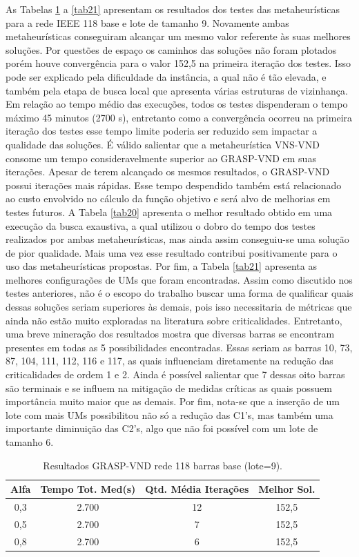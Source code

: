 \documentclass[12pt]{article}
\begin{document}
As Tabelas \ref{tab18} a \ref{tab21} apresentam os resultados dos testes das metaheurísticas para a rede IEEE 118 base e lote de tamanho 9. Novamente ambas metaheurísticas conseguiram alcançar um mesmo valor referente às suas melhores soluções. Por questões de espaço os caminhos das soluções não foram plotados porém houve convergência para o valor 152,5 na primeira iteração dos testes. Isso pode ser explicado pela dificuldade da instância, a qual não é tão elevada, e também pela etapa de busca local que apresenta várias estruturas de vizinhança. Em relação ao tempo médio das execuções, todos os testes dispenderam o tempo máximo 45 minutos (2700 s), entretanto como a convergência ocorreu na primeira iteração dos testes esse tempo limite poderia ser reduzido sem impactar a qualidade das soluções. É válido salientar que a metaheurística VNS-VND consome um tempo consideravelmente superior ao GRASP-VND em suas iterações. Apesar de terem alcançado os mesmos resultados, o GRASP-VND possui iterações mais rápidas. Esse tempo despendido também está relacionado ao custo envolvido no cálculo da função objetivo e será alvo de melhorias em testes futuros. A Tabela \ref{tab20} apresenta o melhor resultado obtido em uma execução da busca exaustiva, a qual utilizou o dobro do tempo dos testes realizados por ambas metaheurísticas, mas ainda assim conseguiu-se uma solução de pior qualidade. Mais uma vez esse resultado contribui positivamente para o uso das metaheurísticas propostas. Por fim, a Tabela \ref{tab21} apresenta as melhores configurações de UMs que foram encontradas. Assim como discutido nos testes anteriores, não é o escopo do trabalho buscar uma forma de qualificar quais dessas soluções seriam superiores às demais, pois isso necessitaria de métricas que ainda não estão muito exploradas na literatura sobre criticalidades. Entretanto, uma breve mineração dos resultados mostra que diversas barras se encontram presentes em todas as 5 possibilidades encontradas. Essas seriam as barras 10, 73, 87, 104, 111, 112, 116 e 117, as quais influenciam diretamente na redução das criticalidades de ordem 1 e 2. Ainda é possível salientar que 7 dessas oito barras são terminais e se influem na mitigação de medidas críticas as quais possuem importância muito maior que as demais. Por fim, nota-se que a inserção de um lote com mais UMs possibilitou não só a redução das C1's, mas também uma importante diminuição das C2's, algo que não foi possível com um lote de tamanho 6.
\begin{table}[H]
	\centering
	\caption{Resultados GRASP-VND rede 118 barras base (lote=9).}
	\begin{tabular}{|c|c|c|c|}
		\hline
		\textbf{Alfa} & \textbf{Tempo Tot. Med(s)} & \textbf{Qtd. Média Iterações} & \textbf{Melhor Sol.} \\
		\hline
		0,3   & 2.700 & 12    & 152,5 \\
		\hline
		0,5   & 2.700 & 7     & 152,5 \\
		\hline
		0,8   & 2.700 & 6     & 152,5 \\
		\hline
	\end{tabular}%
	\label{tab18}%
\end{table}%
\end{document}
